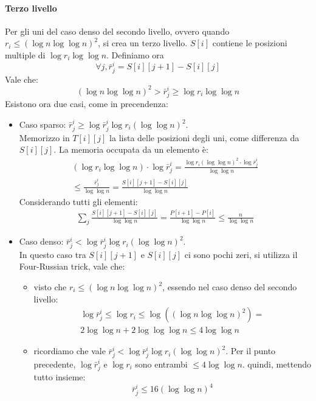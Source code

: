 \paragraph{Terzo livello}
Per gli uni del caso denso del secondo livello, ovvero quando 
$r_i \leq (\log n\log \log n )^2$, si crea un terzo livello.
$S[i]$ contiene le posizioni multiple di $\log r_i \log \log n$.
Definiamo ora
$$\forall j, \bar{r}_j^i = S[i][j+1] - S[i][j]$$
Vale che:
$$ (\log n \log \log n)^2 > \bar{r}_j^i \geq \log r_i \log \log n$$
Esistono ora due casi, come in precendenza:
\begin{itemize}
    \item Caso sparso: $\bar{r}_j^i \geq \log \bar{r}_j^i \log r_i (\log \log n)^2$.\\
    Memorizzo in $T[i][j]$ la lista delle posizioni degli uni, come differenza da $S[i][j]$.
    La memoria occupata da un elemento è:
    \begin{equation}
        \begin{aligned}
            (\log r_i \log \log n)\cdot \log \bar{r}_j^i = 
            \frac{\log r_i (\log \log n)^2\cdot \log \bar{r}_j^i}{\log\log n} 
            \\\leq \frac{\bar{r}_j^i}{\log \log n}
            = \frac{S[i][j+1] - S[i][j]}{\log \log n}
        \end{aligned}
    \end{equation}
    Considerando tutti gli elementi:
    \begin{equation}
        \begin{aligned}
            \sum_j \frac{S[i][j+1] - S[i][j]}{\log \log n} = 
            \frac{P[i+1] - P[i]}{\log \log n} \leq \frac{n}{\log \log n}
        \end{aligned}
    \end{equation}
    \item Caso denso: $\bar{r}_j^i < \log \bar{r}_j^i \log r_i (\log \log n)^2$.\\
    In questo caso tra $S[i][j+1]$ e $S[i][j]$ ci sono pochi zeri, si utilizza il 
    Four-Russian trick, vale che:
    \begin{itemize}
        \item visto che $r_i \leq (\log n \log \log n)^2$, essendo nel 
        caso denso del secondo livello:
        \begin{equation}
            \begin{aligned}
                \log \bar{r}_j^i \leq \log r_i \leq \log((\log n \log \log n)^2) = \\
                2 \log \log n + 2 \log \log \log n \leq 4\log\log n        
            \end{aligned}
        \end{equation}
        \item ricordiamo che vale $\bar{r}_j^i < \log \bar{r}_j^i \log r_i (\log \log n)^2$.
        Per il punto precedente, $\log \bar{r}_j^i$ e $\log r_i$ sono entrambi $\leq 4\log\log n$.
        quindi, mettendo tutto insieme:
        $$\bar{r}_j^i \leq 16(\log \log n)^4$$
    \end{itemize}
\end{itemize}
